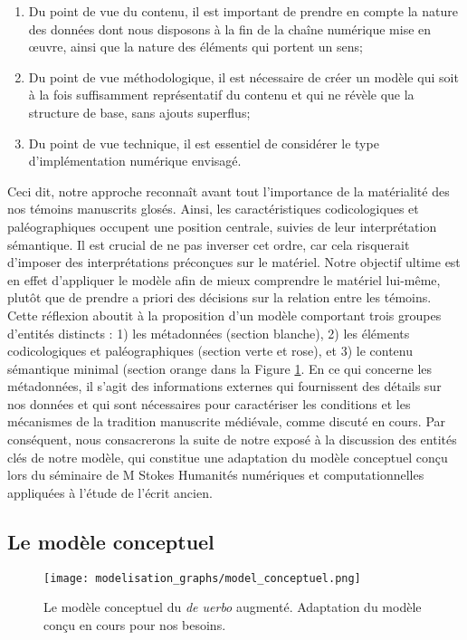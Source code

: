 \documentclass[a4paper, twoside, 12pt]{book}
\begin{document}
\begin{enumerate}
\item Du point de vue du contenu, il est important de prendre en compte la nature des données dont nous disposons à la fin de la chaîne numérique mise en œuvre, ainsi que la nature des éléments qui portent un sens;
\item Du point de vue méthodologique, il est nécessaire de créer un modèle qui soit à la fois suffisamment représentatif du contenu et qui ne révèle que la structure de base, sans ajouts superflus;
\item Du point de vue technique, il est essentiel de considérer le type d'implémentation numérique envisagé.
\end{enumerate}


Ceci dit, notre approche reconnaît avant tout l'importance de la matérialité des nos témoins manuscrits glosés. Ainsi, les caractéristiques codicologiques et paléographiques occupent une position centrale, suivies de leur interprétation sémantique. Il est crucial de ne pas inverser cet ordre, car cela risquerait d'imposer des interprétations préconçues sur le matériel. Notre objectif ultime est en effet d'appliquer le modèle afin de mieux comprendre le matériel lui-même, plutôt que de prendre a priori des décisions sur la relation entre les témoins.\\

Cette réflexion aboutit à la proposition d'un modèle comportant trois groupes d'entités distincts : 1) les métadonnées (section blanche), 2) les éléments codicologiques et paléographiques (section verte et rose), et 3) le contenu sémantique minimal (section orange dans la Figure \ref{fig:modeleconceptuel}. En ce qui concerne les métadonnées, il s'agit des informations externes qui fournissent des détails sur nos données et qui sont nécessaires pour caractériser les conditions et les mécanismes de la tradition manuscrite médiévale, comme discuté en cours. Par conséquent, nous consacrerons la suite de notre exposé à la discussion des entités clés de notre modèle, qui constitue une adaptation du modèle conceptuel conçu lors du séminaire de M Stokes \og{} Humanités numériques et computationnelles appliquées à  l’étude de l’écrit ancien\fg{}.

\subsection{Le modèle conceptuel}

\begin{figure}[H]
    \centering
    \texttt{[image: modelisation\_graphs/model\_conceptuel.png]}
    \caption{Le modèle conceptuel du \textit{de uerbo} augmenté. Adaptation du modèle conçu en cours pour nos besoins.}
    \label{fig:modeleconceptuel}
\end{figure}
\end{document}
